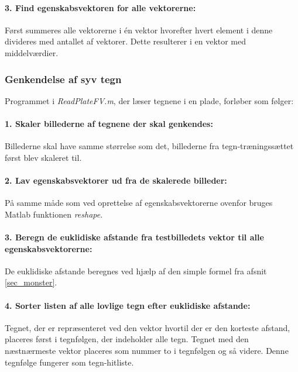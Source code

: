 \paragraph{3. Find egenskabsvektoren for alle vektorerne:} Først summeres alle vektorerne i én vektor hvorefter hvert element i denne divideres med antallet af vektorer. Dette resulterer i en vektor med middelværdier.



\subsubsection*{Genkendelse af syv tegn}

Programmet i \textit{ReadPlateFV.m}, der læser tegnene i en plade, forløber som følger:

\paragraph{1. Skaler billederne af tegnene der skal genkendes:} Billederne skal have samme størrelse som det, billederne fra tegn-træningssættet først blev skaleret til.

\paragraph{2. Lav egenskabsvektorer ud fra de skalerede billeder:} På samme måde som ved oprettelse af egenskabsvektorerne ovenfor bruges Matlab funktionen \textit{reshape}.

\paragraph{3. Beregn de euklidiske afstande fra testbilledets vektor til alle egenskabsvektorerne:} De euklidiske afstande beregnes ved hjælp af den simple formel fra afsnit \vref{sec_monster}.


\paragraph{4. Sorter listen af alle lovlige tegn efter euklidiske afstande:} Tegnet, der er repræsenteret ved den vektor hvortil der er den korteste afstand, placeres først i tegnfølgen, der indeholder alle tegn. Tegnet med den næstnærmeste vektor placeres som nummer to i tegnfølgen og så videre. Denne tegnfølge fungerer som tegn-hitliste.

